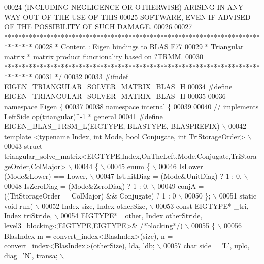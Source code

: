 \begin{DoxyCode}
00024 \textcolor{comment}{ (INCLUDING NEGLIGENCE OR OTHERWISE) ARISING IN ANY WAY OUT OF THE USE OF THIS}
00025 \textcolor{comment}{ SOFTWARE, EVEN IF ADVISED OF THE POSSIBILITY OF SUCH DAMAGE.}
00026 \textcolor{comment}{}
00027 \textcolor{comment}{ ********************************************************************************}
00028 \textcolor{comment}{ *   Content : Eigen bindings to BLAS F77}
00029 \textcolor{comment}{ *   Triangular matrix * matrix product functionality based on ?TRMM.}
00030 \textcolor{comment}{ ********************************************************************************}
00031 \textcolor{comment}{*/}
00032 
00033 \textcolor{preprocessor}{#ifndef EIGEN\_TRIANGULAR\_SOLVER\_MATRIX\_BLAS\_H}
00034 \textcolor{preprocessor}{#define EIGEN\_TRIANGULAR\_SOLVER\_MATRIX\_BLAS\_H}
00035 
00036 \textcolor{keyword}{namespace }\hyperlink{namespace_eigen}{Eigen} \{
00037 
00038 \textcolor{keyword}{namespace }\hyperlink{namespaceinternal}{internal} \{
00039 
00040 \textcolor{comment}{// implements LeftSide op(triangular)^-1 * general}
00041 \textcolor{preprocessor}{#define EIGEN\_BLAS\_TRSM\_L(EIGTYPE, BLASTYPE, BLASPREFIX) \(\backslash\)}
00042 \textcolor{preprocessor}{template <typename Index, int Mode, bool Conjugate, int TriStorageOrder> \(\backslash\)}
00043 \textcolor{preprocessor}{struct triangular\_solve\_matrix<EIGTYPE,Index,OnTheLeft,Mode,Conjugate,TriStorageOrder,ColMajor> \(\backslash\)}
00044 \textcolor{preprocessor}{\{ \(\backslash\)}
00045 \textcolor{preprocessor}{  enum \{ \(\backslash\)}
00046 \textcolor{preprocessor}{    IsLower = (Mode&Lower) == Lower, \(\backslash\)}
00047 \textcolor{preprocessor}{    IsUnitDiag  = (Mode&UnitDiag) ? 1 : 0, \(\backslash\)}
00048 \textcolor{preprocessor}{    IsZeroDiag  = (Mode&ZeroDiag) ? 1 : 0, \(\backslash\)}
00049 \textcolor{preprocessor}{    conjA = ((TriStorageOrder==ColMajor) && Conjugate) ? 1 : 0 \(\backslash\)}
00050 \textcolor{preprocessor}{  \}; \(\backslash\)}
00051 \textcolor{preprocessor}{  static void run( \(\backslash\)}
00052 \textcolor{preprocessor}{      Index size, Index otherSize, \(\backslash\)}
00053 \textcolor{preprocessor}{      const EIGTYPE* \_tri, Index triStride, \(\backslash\)}
00054 \textcolor{preprocessor}{      EIGTYPE* \_other, Index otherStride, level3\_blocking<EIGTYPE,EIGTYPE>& }\textcolor{comment}{/*blocking*/}\textcolor{preprocessor}{) \(\backslash\)}
00055 \textcolor{preprocessor}{  \{ \(\backslash\)}
00056 \textcolor{preprocessor}{   BlasIndex m = convert\_index<BlasIndex>(size), n = convert\_index<BlasIndex>(otherSize), lda, ldb; \(\backslash\)}
00057 \textcolor{preprocessor}{   char side = 'L', uplo, diag='N', transa; \(\backslash\)}

\end{DoxyCode}
